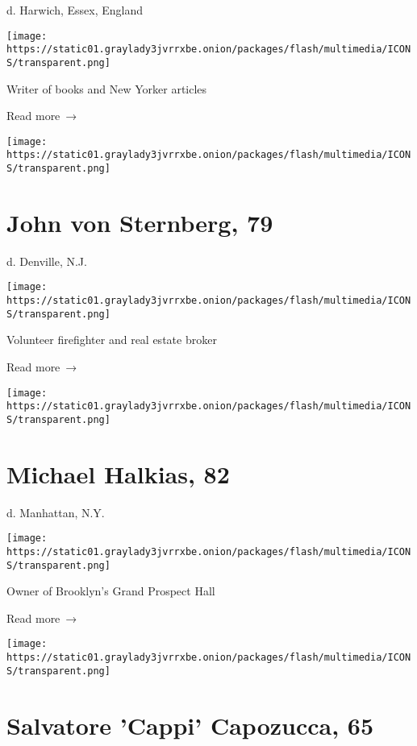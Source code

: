 d. Harwich, Essex, England

\texttt{[image: https://static01.graylady3jvrrxbe.onion/packages/flash/multimedia/ICONS/transparent.png]}

Writer of books and New Yorker articles

 Read more~→

\href{https://www.nytimes3xbfgragh.onion/2020/05/26/obituaries/john-von-sternberg-dead-coronavirus.html}{}

\texttt{[image: https://static01.graylady3jvrrxbe.onion/packages/flash/multimedia/ICONS/transparent.png]}

\hypertarget{john-von-sternberg-79}{%
\section{John von Sternberg, 79}\label{john-von-sternberg-79}}

d. Denville, N.J.

\texttt{[image: https://static01.graylady3jvrrxbe.onion/packages/flash/multimedia/ICONS/transparent.png]}

Volunteer firefighter and real estate broker

 Read more~→

\href{https://www.nytimes3xbfgragh.onion/2020/05/24/obituaries/michael-halkias-dead-coronavirus.html}{}

\texttt{[image: https://static01.graylady3jvrrxbe.onion/packages/flash/multimedia/ICONS/transparent.png]}

\hypertarget{michael-halkias-82}{%
\section{Michael Halkias, 82}\label{michael-halkias-82}}

d. Manhattan, N.Y.

\texttt{[image: https://static01.graylady3jvrrxbe.onion/packages/flash/multimedia/ICONS/transparent.png]}

Owner of Brooklyn's Grand Prospect Hall

 Read more~→

\href{https://www.nytimes3xbfgragh.onion/2020/05/24/nyregion/sal-capozucca-dead-coronavirus.html}{}

\texttt{[image: https://static01.graylady3jvrrxbe.onion/packages/flash/multimedia/ICONS/transparent.png]}

\hypertarget{salvatore-cappi-capozucca-65}{%
\section{Salvatore 'Cappi' Capozucca,
65}\label{salvatore-cappi-capozucca-65}}


